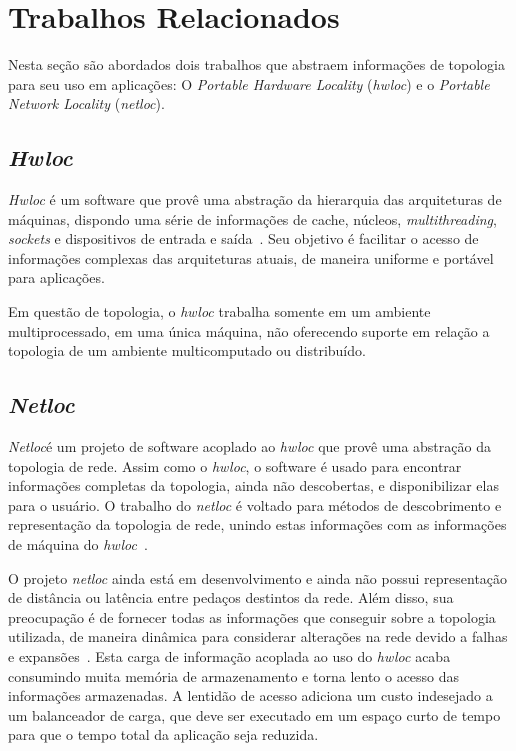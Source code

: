 \documentclass[
	12pt,				%
	openright,			%
	twoside,			%
	a4paper,			%
	english,			%
	brazil,				%
	]{abntex2}
\newcommand{\hwloc}{{\textit{hwloc}}\xspace}
\newcommand{\Hwloc}{{\textit{Hwloc}}\xspace}
\newcommand{\netloc}{{\textit{netloc}}\xspace}
\newcommand{\Netloc}{{\textit{Netloc}\xspace}}
\begin{document}
\section{Trabalhos Relacionados}
\label{sec:trabalhos}

Nesta seção são abordados dois trabalhos que abstraem informações de topologia para seu uso em aplicações: O \textit{Portable Hardware Locality} (\hwloc) e o \textit{Portable Network Locality} (\netloc).

\subsection{\Hwloc}

\Hwloc é um software que provê uma abstração da hierarquia das arquiteturas de máquinas, dispondo uma série de informações de cache, núcleos, \textit{multithreading}, \textit{sockets} e dispositivos de entrada e saída~\cite{broquedis:hwloc}.
Seu objetivo é facilitar o acesso de informações complexas das arquiteturas atuais, de maneira uniforme e portável para aplicações. 

Em questão de topologia, o \hwloc trabalha somente em um ambiente multiprocessado, em uma única máquina, não oferecendo suporte em relação a topologia de um ambiente multicomputado ou distribuído.

\subsection{\Netloc}

\Netloc é um projeto de software acoplado ao \hwloc que provê uma abstração da topologia de rede.
Assim como o \hwloc, o software é usado para encontrar informações completas da topologia, ainda não descobertas, e disponibilizar elas para o usuário.
O trabalho do \netloc é voltado para métodos de descobrimento e representação da topologia de rede, unindo estas informações com as informações de máquina do \hwloc~\cite{Goglin:netloc}.

O projeto \netloc ainda está em desenvolvimento e ainda não possui representação de distância ou latência entre pedaços destintos da rede.
Além disso, sua preocupação é de fornecer todas as informações que conseguir sobre a topologia utilizada, de maneira dinâmica para considerar alterações na rede devido a falhas e expansões~\cite{Goglin:netloc}.
Esta carga de informação acoplada ao uso do \hwloc acaba consumindo muita memória de armazenamento e torna lento o acesso das informações armazenadas.
A lentidão de acesso adiciona um custo indesejado a um balanceador de carga, que deve ser executado em um espaço curto de tempo para que o tempo total da aplicação seja reduzida.
\end{document}
